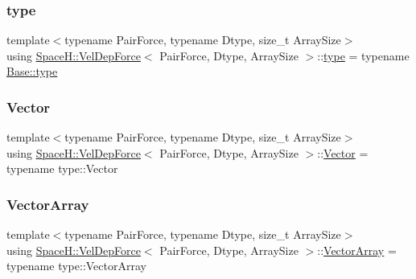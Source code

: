 \mbox{\label{struct_space_h_1_1_vel_dep_force_a734e14a30f08b7c4bf6c8cd529c0bd1c}} 
\subsubsection{\texorpdfstring{type}{type}}
{\footnotesize\ttfamily template$<$typename Pair\+Force, typename Dtype, size\+\_\+t Array\+Size$>$ \\
using \mbox{\hyperlink{struct_space_h_1_1_vel_dep_force}{Space\+H\+::\+Vel\+Dep\+Force}}$<$ Pair\+Force, Dtype, Array\+Size $>$\+::\mbox{\hyperlink{struct_space_h_1_1_vel_dep_force_a734e14a30f08b7c4bf6c8cd529c0bd1c}{type}} =  typename \mbox{\hyperlink{struct_space_h_1_1_force_a151c6ae1ec7ad87825c2b6cc74aee5f2}{Base\+::type}}}

\mbox{\label{struct_space_h_1_1_vel_dep_force_a229c41eb710a16ec67978bb98c532622}} 
\subsubsection{\texorpdfstring{Vector}{Vector}}
{\footnotesize\ttfamily template$<$typename Pair\+Force, typename Dtype, size\+\_\+t Array\+Size$>$ \\
using \mbox{\hyperlink{struct_space_h_1_1_vel_dep_force}{Space\+H\+::\+Vel\+Dep\+Force}}$<$ Pair\+Force, Dtype, Array\+Size $>$\+::\mbox{\hyperlink{struct_space_h_1_1_vel_dep_force_a229c41eb710a16ec67978bb98c532622}{Vector}} =  typename type\+::\+Vector}

\mbox{\label{struct_space_h_1_1_vel_dep_force_ad2d0301ffff67a74018b92c17a3475de}} 
\subsubsection{\texorpdfstring{Vector\+Array}{VectorArray}}
{\footnotesize\ttfamily template$<$typename Pair\+Force, typename Dtype, size\+\_\+t Array\+Size$>$ \\
using \mbox{\hyperlink{struct_space_h_1_1_vel_dep_force}{Space\+H\+::\+Vel\+Dep\+Force}}$<$ Pair\+Force, Dtype, Array\+Size $>$\+::\mbox{\hyperlink{struct_space_h_1_1_vel_dep_force_ad2d0301ffff67a74018b92c17a3475de}{Vector\+Array}} =  typename type\+::\+Vector\+Array}



